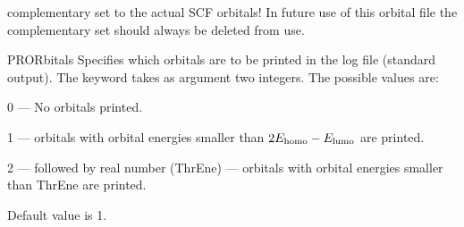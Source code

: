 \begin{keywordlist}
complementary set to the actual SCF orbitals! In future use of this orbital
file the complementary set should always be deleted from use.
\item[PRORbitals]
Specifies which orbitals are to be printed in the log file (standard output).
The keyword takes as argument two integers.
The possible values are:
\begin{list}{}{}
\item 0 --- No orbitals printed.
\item 1 --- orbitals with orbital energies smaller than
$2E_{\rm homo}-E_{\rm lumo}$ are printed.
\item 2 --- followed by real number (ThrEne) --- orbitals with orbital
energies smaller than ThrEne are printed.
\end{list}
Default value is 1.


\end{keywordlist}
